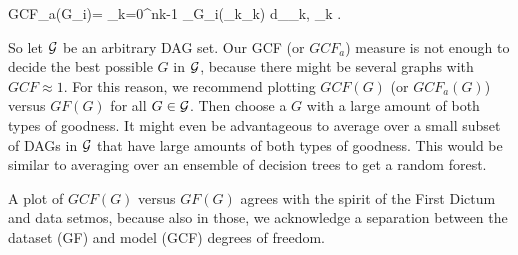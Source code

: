 \beq
GCF_a(G_i)= 
\sum_{k=0}^{nk-1}
\s_{G_i}(\rva_k\text{---}\rvb_k)
d_{\rva_k, \rvb_k}
\;.
\eeq

So let ${\cal G}$
be an arbitrary DAG set.
Our GCF (or $GCF_a$) measure
is not enough to
decide the best 
possible $G$ in ${\cal G}$,
because there might 
be several graphs with 
$GCF\approx 1$.
For this reason,
we recommend
plotting $GCF(G)$ (or $GCF_a(G)$)
versus $GF(G)$
for all $G\in{\cal G}$.
Then  choose a $G$ with a
large amount
of both types of goodness.
It might even be
advantageous to average over
a small subset of DAGs in  ${\cal G}$
that have large amounts of both
types of goodness.
This would be similar to  averaging
over an ensemble of decision trees to get 
a random forest.

A plot of 
$GCF(G)$
versus $GF(G)$
agrees with the spirit of
the First 
Dictum and data setmos,
because also in those,
we acknowledge a separation between the
dataset (GF)  and model (GCF) degrees of freedom.

